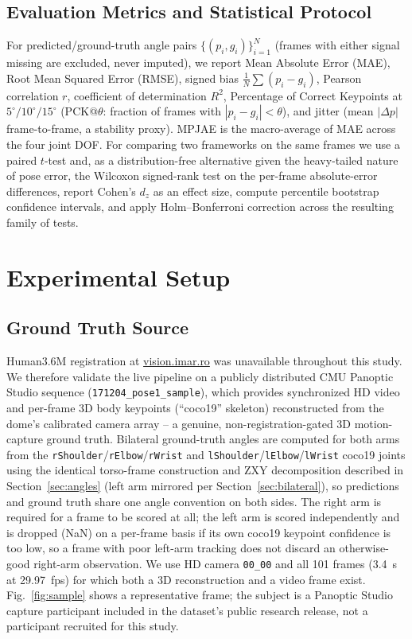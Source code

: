 \documentclass[conference]{IEEEtran}
\begin{document}
\subsection{Evaluation Metrics and Statistical Protocol}
\label{sec:metrics}
For predicted/ground-truth angle pairs $\{(p_i, g_i)\}_{i=1}^{N}$ (frames
with either signal missing are excluded, never imputed), we report Mean
Absolute Error (MAE), Root Mean Squared Error (RMSE), signed bias
$\frac1N\sum(p_i-g_i)$, Pearson correlation $r$, coefficient of
determination $R^2$, Percentage of Correct Keypoints at
$5^\circ/10^\circ/15^\circ$ (PCK@$\theta$: fraction of frames with
$|p_i-g_i|<\theta$), and jitter (mean $|\Delta p|$ frame-to-frame, a
stability proxy). MPJAE is the macro-average of MAE across the four
joint DOF. For comparing two frameworks on the same frames we use a
paired $t$-test and, as a distribution-free alternative given the
heavy-tailed nature of pose error, the Wilcoxon signed-rank test on the
per-frame absolute-error differences, report Cohen's $d_z$ as an effect
size, compute percentile bootstrap confidence intervals, and apply
Holm--Bonferroni correction across the resulting family of tests.

\section{Experimental Setup}
\label{sec:setup}

\subsection{Ground Truth Source}
Human3.6M \cite{ionescu2014human36m} registration at
\url{vision.imar.ro} was unavailable throughout this study. We therefore
validate the live pipeline on a publicly distributed CMU Panoptic Studio
\cite{joo2015panoptic} sequence (\texttt{171204\_pose1\_sample}), which
provides synchronized HD video and per-frame 3D body keypoints
(``coco19'' skeleton) reconstructed from the dome's calibrated camera
array -- a genuine, non-registration-gated 3D motion-capture ground
truth. Bilateral ground-truth angles are computed for both arms from the
\texttt{rShoulder}/\texttt{rElbow}/\texttt{rWrist} and
\texttt{lShoulder}/\texttt{lElbow}/\texttt{lWrist} coco19 joints using
the identical torso-frame construction and ZXY decomposition described
in Section~\ref{sec:angles} (left arm mirrored per
Section~\ref{sec:bilateral}), so predictions and ground truth share one
angle convention on both sides. The right arm is required for a frame to
be scored at all; the left arm is scored independently and is dropped
(NaN) on a per-frame basis if its own coco19 keypoint confidence is too
low, so a frame with poor left-arm tracking does not discard an
otherwise-good right-arm observation. We use HD camera \texttt{00\_00}
and all 101 frames
(3.4~s at 29.97~fps) for which both a 3D reconstruction and a video frame
exist. Fig.~\ref{fig:sample} shows a representative frame; the subject
is a Panoptic Studio capture participant included in the dataset's
public research release, not a participant recruited for this study.
\end{document}
